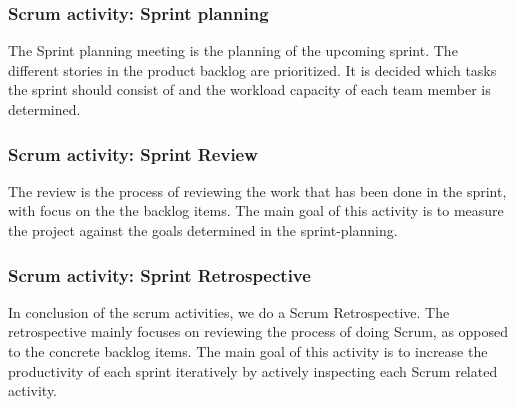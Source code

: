 \subsubsection{Scrum activity: Sprint planning}
The Sprint planning meeting is the planning of the upcoming sprint. The different stories in the product backlog are prioritized. It is decided which tasks the sprint should consist of and the workload capacity of each team member is determined.

\subsubsection{Scrum activity: Sprint Review}
The review is the process of reviewing the work that has been done in the sprint, with focus on the the backlog items. The main goal of this activity is to measure the project against the goals determined in the sprint-planning.

\subsubsection{Scrum activity: Sprint Retrospective}
In conclusion of the scrum activities, we do a Scrum Retrospective. The retrospective mainly focuses on reviewing the process of doing Scrum, as opposed to the concrete backlog items. The main goal of this activity is to increase the productivity of each sprint iteratively by actively inspecting each Scrum related activity.